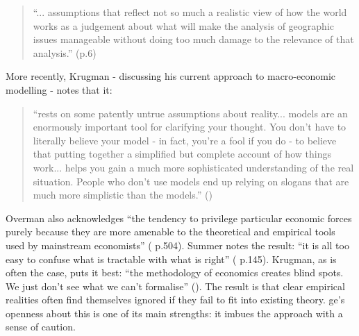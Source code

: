 \begin{quote}
``... assumptions that reflect not so much a realistic view of how the world works as a judgement about what will make the analysis of geographic issues manageable without doing too much damage to the relevance of that analysis.'' (p.6)
\end{quote}

More recently, Krugman - discussing his current approach to macro-economic modelling - notes that it:

\begin{quote}
``rests on some patently untrue assumptions about reality... models are an enormously important tool for clarifying your thought. You don't have to literally believe your model - in fact, you're a fool if you do - to believe that putting together a simplified but complete account of how things work... helps you gain a much more sophisticated understanding of the real situation. People who don't use models end up relying on slogans that are much more simplistic than the models.'' (\citealt{krugman_debt_2010})
\end{quote}

Overman also acknowledges ``the tendency to privilege particular economic forces purely because they are more amenable to the theoretical and empirical tools used by mainstream economists'' (\citealt{overman_can_2004} p.504). Summer notes the result: ``it is all too easy to confuse what is tractable with what is right'' (\citealt{summers_scientific_1991} p.145). Krugman, as is often the case, puts it best: ``the methodology of economics creates blind spots. We just don't see what we can't formalise'' (\citealt{krugman_how_2005}). The result is that clear empirical realities often find themselves ignored if they fail to fit into existing theory. \gls{ge}'s openness about this is one of its main strengths: it imbues the approach with a sense of caution. 

